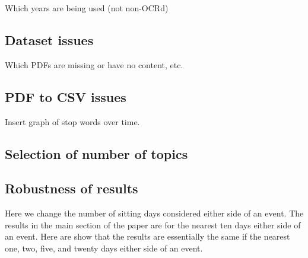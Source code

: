 \documentclass[12pt,]{article}
\begin{document}
Which years are being used (not non-OCRd)

\subsection{Dataset issues}\label{dataset-issues}

Which PDFs are missing or have no content, etc.

\subsection{PDF to CSV issues}\label{pdf-to-csv-issues}

Insert graph of stop words over time.

\subsection{Selection of number of
topics}\label{selection-of-number-of-topics}

\subsection{Robustness of results}\label{robustness-of-results}

Here we change the number of sitting days considered either side of an
event. The results in the main section of the paper are for the nearest
ten days either side of an event. Here are show that the results are
essentially the same if the nearest one, two, five, and twenty days
either side of an event.

\newpage




\newpage
\singlespacing 
\renewcommand\refname{References}

\end{document}
